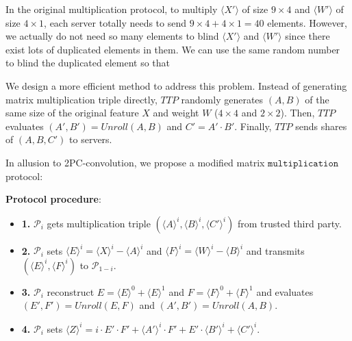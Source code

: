 \documentclass[letterpaper]{article} %
\begin{document}
    In the original multiplication protocol, to multiply $\langle X'\rangle$ of size $9\times 4$ and $\langle W'\rangle$ of size $4\times 1$, 
    each server totally needs to send $9\times 4+4\times 1=40$ elements.
    However, we actually do not need so many elements to blind $\langle X'\rangle$ and $\langle W'\rangle$
    since there exist lots of duplicated elements in them. 
    We can use the same random number to blind the duplicated element
    so that 

    
    We design a more efficient method to address this problem.
    Instead of generating matrix multiplication triple directly, 
    $TTP$ randomly generates $(A,B)$ of the same size of the original feature $X$ and weight $W$ ($4\times 4$ and $2\times 2$).
    Then, $TTP$ evaluates 
    $( A',B')=Unroll(A,B)$ and 
    $C' =A'\cdot B' $.
    Finally, $TTP$ sends shares of $(A,B,C')$ to servers.
    
    In allusion to 2PC-convolution, we propose a modified matrix $\mathtt{multiplication}$ protocol:
 
    \textbf{Protocol procedure}:
    \begin{itemize}
        \item \textbf{1.} $\mathcal{P}_{i}$ gets multiplication triple 
        $(\langle A\rangle ^{i},\langle B\rangle ^{i},\langle C'\rangle ^{i})$ from trusted third party.
        \item \textbf{2.} $\mathcal{P}_{i}$ sets $\langle E\rangle ^{i}=\langle X\rangle ^{i}-\langle A\rangle ^{i}$ and $\langle F\rangle ^{i}=\langle W\rangle ^{i}-\langle B\rangle ^{i}$
        and transmits $(\langle E\rangle ^{i},\langle F\rangle ^{i})$ to $\mathcal{P}_{1-i}$.
        \item \textbf{3.} $\mathcal{P}_{i}$ reconstruct $E = \langle E\rangle ^{0}+\langle E\rangle ^{1}$ and $F = \langle F\rangle ^{0}+\langle F\rangle ^{1}$
        and evaluates $(E',F')=Unroll(E,F)$ and $(A',B')=Unroll(A,B)$.
        \item \textbf{4.} $\mathcal{P}_{i}$ sets $\langle Z\rangle^{i}=i\cdot E' \cdot F' + \langle A'\rangle^{i} \cdot F' + E' \cdot \langle B'\rangle^{i} + \langle C'\rangle^{i}$.
    
    \end{itemize}
\end{document}
